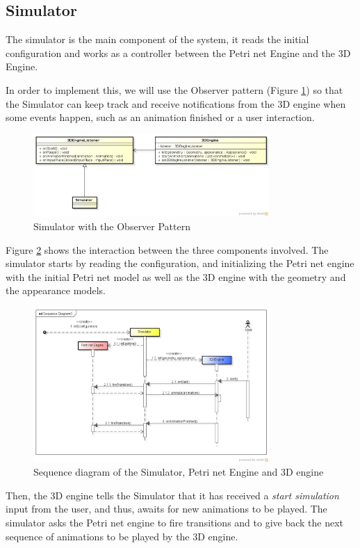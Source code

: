\subsection{Simulator}

The simulator is the main component of the system, it reads the initial configuration and works as a controller between the Petri net Engine and the 3D Engine.

In order to implement this, we will use the Observer pattern (Figure \ref{fig:observer-pattern}) so that the Simulator can keep track and receive notifications from the 3D engine when some events happen, such as an animation finished or a user interaction.

\begin{figure}[htp]
\begin{center}
  \includegraphics[width=0.8\textwidth]{image/ObserverPattern.png}
  \caption{Simulator with the Observer Pattern}
  \label{fig:observer-pattern}
\end{center}
\end{figure}

Figure \ref{fig:sd-engines} shows the interaction between the three components involved. The simulator starts by reading the configuration, and initializing the Petri net engine with the initial Petri net model as well as the 3D engine with the geometry and the appearance models. 

\begin{figure}[htp]
\begin{center}
  \includegraphics[width=0.8\textwidth]{image/sd-engines.png}
  \caption{Sequence diagram of the Simulator, Petri net Engine and 3D engine}
  \label{fig:sd-engines}
\end{center}
\end{figure}

Then, the 3D engine tells the Simulator that it has received a \textit{start simulation} input from the user, and thus, awaits for new animations to be played. The simulator asks the Petri net engine to fire transitions and to give back the next sequence of animations to be played by the 3D engine.